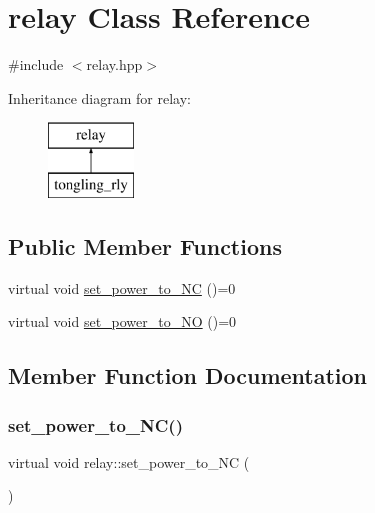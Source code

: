 \hypertarget{classrelay}{}\section{relay Class Reference}
\label{classrelay}


{\ttfamily \#include $<$relay.\+hpp$>$}

Inheritance diagram for relay\+:\begin{figure}[H]
\begin{center}
\leavevmode
\includegraphics[height=2.000000cm]{classrelay}
\end{center}
\end{figure}
\subsection*{Public Member Functions}
\begin{DoxyCompactItemize}
\item 
virtual void \hyperlink{classrelay_a8d162f8fe936cc0771c277d5f142550e}{set\+\_\+power\+\_\+to\+\_\+\+NC} ()=0
\item 
virtual void \hyperlink{classrelay_ad846781772d5291d973300789260690b}{set\+\_\+power\+\_\+to\+\_\+\+NO} ()=0
\end{DoxyCompactItemize}


\subsection{Member Function Documentation}
\mbox{\label{classrelay_a8d162f8fe936cc0771c277d5f142550e}} 
\subsubsection{\texorpdfstring{set\+\_\+power\+\_\+to\+\_\+\+N\+C()}{set\_power\_to\_NC()}}
{\footnotesize\ttfamily virtual void relay\+::set\+\_\+power\+\_\+to\+\_\+\+NC (\begin{DoxyParamCaption}{ }\end{DoxyParamCaption})\hspace{0.3cm}{\ttfamily [pure virtual]}}




